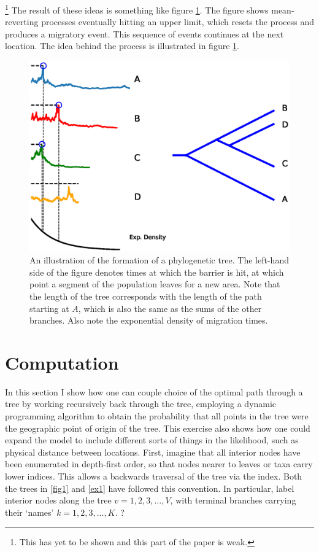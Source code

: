 \documentclass[11pt]{article}
\begin{document}
\footnote{This has yet to be shown and this part of the paper is weak.} The result of these ideas is something like figure \ref{evo1}. The figure shows mean-reverting processes eventually hitting an upper limit, which resets the process and produces a migratory event. This sequence of events continues at the next location. The idea behind the process is illustrated in figure \ref{evo1}.

\begin{figure}
\begin{center}
\includegraphics[width=\textwidth]{AncillaryFiles//figure3.eps}
\caption{An illustration of the formation of a phylogenetic tree. The left-hand side of the figure denotes times at which the barrier is hit, at which point a segment of the population leaves for a new area. Note that the length of the tree corresponds with the length of the path starting at $A$, which is also the same as the sums of the other branches. Also note the exponential density of migration times.} \label{evo1}
\end{center} 
\end{figure}


\section{Computation}

In this section I  show how one can couple choice of the optimal path through a tree by working recursively back through the tree, employing a dynamic programming algorithm to obtain the probability that all points in the tree were the geographic point of origin of the tree. This exercise also shows how one could expand the model to include different sorts of things in the likelihood, such as physical distance between locations. First, imagine that all interior nodes have been enumerated in depth-first order, so that nodes nearer to leaves or taxa carry lower indices. This allows a backwards traversal of the tree via the index. Both the trees in \ref{fig1} and \ref{ex1} have followed this convention. In particular, label interior nodes along the tree $v=1,2,3,\hdots,V$, with terminal branches carrying their `names'  $k=1,2,3,\hdots,K$. 
?
\end{document}
